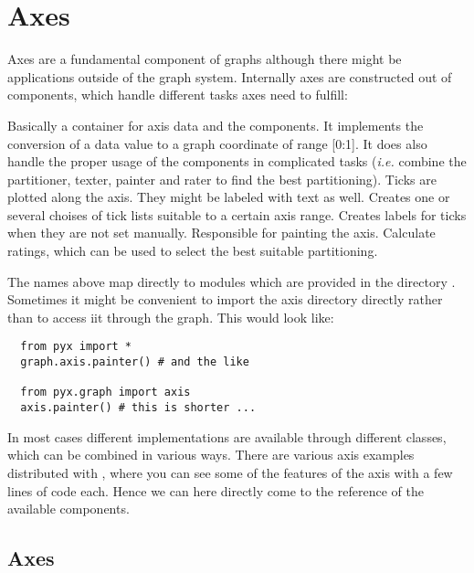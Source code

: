 \chapter{Axes\label{axis}}

Axes are a fundamental component of graphs although there might be 
applications outside of the graph system. Internally axes are 
constructed out of components, which handle different tasks axes 
need to fulfill:

\begin{definitions}
  Basically a container for axis data and the components. It
  implements the conversion of a data value to a graph coordinate of
  range [0:1]. It does also handle the proper usage of the components
  in complicated tasks (\emph{i.e.} combine the partitioner, texter,
  painter and rater to find the best partitioning).
  Ticks are plotted along the axis. They might be labeled with text as
  well.
  Creates one or several choises of tick lists suitable to a certain
  axis range.
  Creates labels for ticks when they are not set manually.
  Responsible for painting the axis.
  Calculate ratings, which can be used to select the best suitable
  partitioning.
\end{definitions}

The names above map directly to modules which are provided in the
directory . Sometimes it might be convenient to
import the axis directory directly rather than to access iit through 
the graph. This would look like:
\begin{verbatim}
  from pyx import *
  graph.axis.painter() # and the like

  from pyx.graph import axis
  axis.painter() # this is shorter ...
\end{verbatim}

In most cases different implementations are available through
different classes, which can be combined in various ways. There are
various axis examples distributed with \PyX{}, where you can see some
of the features of the axis with a few lines of code each. Hence we
can here directly come to the reference of the available
components.

\section{Axes}


